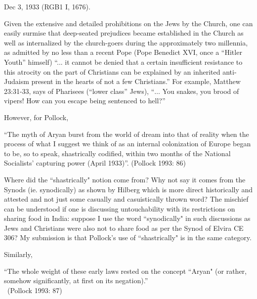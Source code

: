 Dec 3, 1933 (RGB1 I, 1676).

Given the extensive and detailed prohibitions on the Jews by the Church, one can easily surmise that deep-seated prejudices became established in the Church as well as internalized by the church-goers during the approximately two millennia, as admitted by no less than a recent Pope (Pope Benedict XVI, once a ``Hitler Youth'' himself) “... it cannot be denied that a certain insufficient resistance to this atrocity on the part of Christians can be explained by an inherited anti-Judaism present in the hearts of not a few Christians.” For example, Matthew 23:31-33, says of Pharisees (“lower class” Jews), “$\ldots$ You snakes, you brood of vipers! How can you escape being sentenced to hell?”

However, for Pollock, 
\begin{myquote}
“The myth of Aryan burst from the world of dream into that of reality when the process of what I suggest we think of as an internal colonization of Europe began to be, so to speak, shastrically codified, within two months of the National Socialists' capturing power (April 1933)”. 	\hfill (Pollock 1993: 86)
\end{myquote}

Where did the ``shastrically" notion come from? Why not say it comes from the Synods (ie. synodically) as shown by Hilberg which is more direct historically and attested and not just some casually and casuistically thrown word? The mischief can be understood if one is discussing untouchability with its restrictions on sharing food in India: suppose I use the word ``synodically" in such discussions as Jews and Christians were also not to share food as per the Synod of Elvira CE 306? My submission is that Pollock's use of ``shastrically" is in the same category.

Similarly, 
\begin{myquote}
``The whole weight of these early laws rested on the concept ``Aryan" (or rather, somehow significantly, at first on its negation).”\\[-15pt]

~\hfill(Pollock 1993: 87)
\end{myquote}

